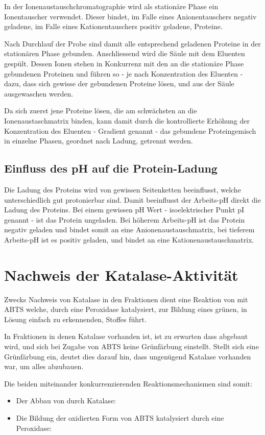 \documentclass[a4paper,german]{scrreprt}
\begin{document}
In der Ionenaustauschchromatographie wird als stationäre Phase ein
Ionentauscher verwendet. Dieser bindet, im Falle eines Anionentauschers negativ
geladene, im Falle eines Kationentauschers positiv geladene, Proteine.

Nach Durchlauf der Probe sind damit alle entsprechend geladenen Proteine in der
stationären Phase gebunden. Anschliessend wird die Säule mit dem Eluenten
gespült. Dessen Ionen stehen in Konkurrenz mit den an die stationäre Phase
gebundenen Proteinen und führen so - je nach Konzentration des Eluenten - dazu,
dass sich gewisse der gebundenen Proteine lösen, und aus der Säule ausgewaschen
werden.

Da sich zuerst jene Proteine lösen, die am schwächsten an die
Ionenaustaschmatrix binden, kann damit durch die kontrollierte Erhöhung der
Konzentration des Eluenten - Gradient genannt - das gebundene Proteingemisch in
einzelne Phasen, geordnet nach Ladung, getrennt werden.

\subsection{Einfluss des pH auf die Protein-Ladung}

Die Ladung des Proteins wird von gewissen Seitenketten beeinflusst, welche
unterschiedlich gut protonierbar sind. Damit beeinflusst der Arbeits-pH direkt
die Ladung des Proteins. Bei einem gewissen pH Wert - isoelektrischer Punkt pI
genannt - ist das Protein ungeladen. Bei höherem Arbeits-pH ist das Protein
negativ geladen und bindet somit an eine Anionenaustauschmatrix, bei tieferem
Arbeits-pH ist es positiv geladen, und bindet an eine Kationenaustauschmatrix.

\section{Nachweis der Katalase-Aktivität}

Zwecks Nachweis von Katalase in den Fraktionen dient eine Reaktion von
 mit ABTS welche, durch eine Peroxidase katalysiert, zur Bildung eines
grünen, in Lösung einfach zu erkennenden, Stoffes führt.

In Fraktionen in denen Katalase vorhanden ist, ist zu erwarten dass 
abgebaut wird, und sich bei Zugabe von ABTS keine Grünfärbung einstellt. Stellt
sich eine Grünfärbung ein, deutet dies darauf hin, dass ungenügend Katalase
vorhanden war, um alles  abzubauen.

Die beiden miteinander konkurrenzierenden Reaktionsmechanismen sind somit:
\begin{itemize}
	\item Der Abbau von  durch Katalase: 
	\item Die Bildung der oxidierten Form von ABTS katalysiert durch eine
		Peroxidase: 
\end{itemize}
\end{document}
